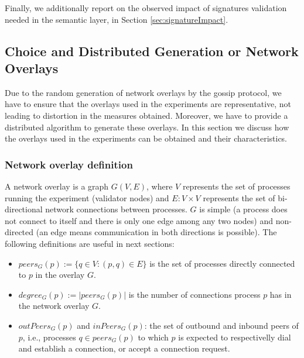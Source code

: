 Finally, we additionally report on the observed impact of signatures validation needed in the semantic layer, in Section \ref{sec:signatureImpact}.















\subsection{Choice and Distributed Generation or Network Overlays}
\label{sec:topos}

Due to the random generation of network overlays by the gossip protocol, 
we have to ensure that the overlays used in the experiments are representative, not leading to distortion in the measures obtained.
Moreover, we have to provide a distributed algorithm to generate these overlays. In this section we discuss how the overlays used in the experiments can be obtained and their characteristics.

\subsubsection{Network overlay definition}

A network overlay is a graph $G(V,E)$, where $V$ represents the set of
processes running the experiment (validator nodes) and $E: V \times V$ represents the set of bi-directional network connections between processes.  $G$ is simple (a process does not connect to itself and there is only one edge among any two nodes) and non-directed
(an edge means communication in both directions is possible).  The following definitions are useful in next sections:
\begin{itemize}
	\item $peers_G(p) := \{q \in V : (p, q) \in E\}$ is the set of processes directly
	connected to $p$ in the overlay $G$.
    \item $degree_G(p) := |peers_G(p)|$ is the number of connections process $p$ has in
  the network overlay $G$.
   \item   $outPeers_G(p)$ and $inPeers_G(p)$: the set of outbound and inbound peers of $p$, i.e., 
	processes $q \in peers_G(p)$ to which $p$ is expected to respectivelly dial
     and establish a connection, or accept a connection request.
\end{itemize}

